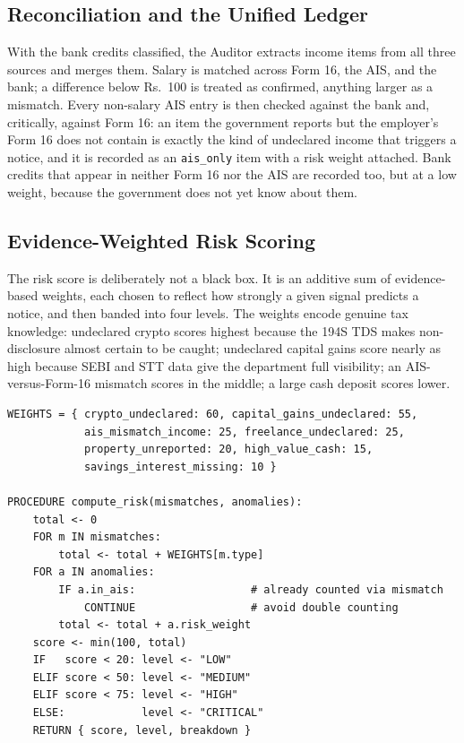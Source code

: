 \subsection{Reconciliation and the Unified Ledger}
With the bank credits classified, the Auditor extracts income items from all
three sources and merges them. Salary is matched across Form 16, the AIS, and
the bank; a difference below Rs.~100 is treated as confirmed, anything larger as
a mismatch. Every non-salary AIS entry is then checked against the bank and,
critically, against Form 16: an item the government reports but the employer's
Form 16 does not contain is exactly the kind of undeclared income that triggers
a notice, and it is recorded as an \texttt{ais\_only} item with a risk weight
attached. Bank credits that appear in neither Form 16 nor the AIS are recorded
too, but at a low weight, because the government does not yet know about them.

\subsection{Evidence-Weighted Risk Scoring}
The risk score is deliberately not a black box. It is an additive sum of
evidence-based weights, each chosen to reflect how strongly a given signal
predicts a notice, and then banded into four levels. The weights encode genuine
tax knowledge: undeclared crypto scores highest because the 194S TDS makes
non-disclosure almost certain to be caught; undeclared capital gains score
nearly as high because SEBI and STT data give the department full visibility; an
AIS-versus-Form-16 mismatch scores in the middle; a large cash deposit scores
lower.

\begin{lstlisting}[style=pseudo]
WEIGHTS = { crypto_undeclared: 60, capital_gains_undeclared: 55,
            ais_mismatch_income: 25, freelance_undeclared: 25,
            property_unreported: 20, high_value_cash: 15,
            savings_interest_missing: 10 }

PROCEDURE compute_risk(mismatches, anomalies):
    total <- 0
    FOR m IN mismatches:
        total <- total + WEIGHTS[m.type]
    FOR a IN anomalies:
        IF a.in_ais:                  # already counted via mismatch
            CONTINUE                  # avoid double counting
        total <- total + a.risk_weight
    score <- min(100, total)
    IF   score < 20: level <- "LOW"
    ELIF score < 50: level <- "MEDIUM"
    ELIF score < 75: level <- "HIGH"
    ELSE:            level <- "CRITICAL"
    RETURN { score, level, breakdown }
\end{lstlisting}

